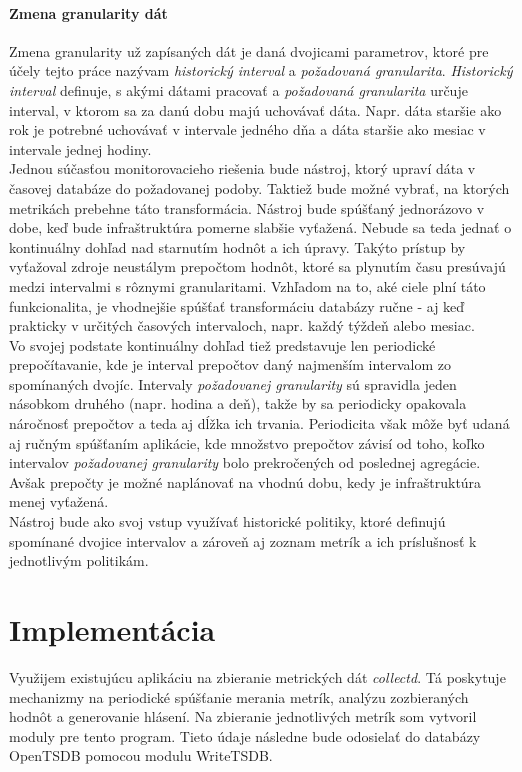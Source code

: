 \documentclass[12pt,twoside,color,cover,table]{fithesis3}
\begin{document}
\subsubsection{Zmena granularity dát}
Zmena granularity už zapísaných dát je daná dvojicami parametrov, ktoré pre účely tejto práce nazývam
\textit{historický interval} a \textit{požadovaná granularita}. \textit{Historický interval} definuje, s akými dátami pracovať a 
\textit{požadovaná granularita} určuje
interval, v ktorom sa za danú dobu majú uchovávať dáta. Napr. dáta staršie ako rok je potrebné uchovávať v intervale jedného dňa a 
dáta staršie ako mesiac v intervale jednej hodiny. 
\\Jednou súčasťou monitorovacieho riešenia bude nástroj, ktorý upraví dáta v časovej databáze do požadovanej podoby.
Taktiež bude možné vybrať,
na ktorých metrikách prebehne táto transformácia. Nástroj bude spúšťaný jednorázovo v dobe, keď bude infraštruktúra pomerne slabšie vyťažená.
Nebude sa teda jednať o kontinuálny dohľad nad starnutím hodnôt a ich úpravy. Takýto prístup by vyťažoval zdroje neustálym prepočtom hodnôt,
ktoré sa plynutím času presúvajú medzi intervalmi s rôznymi granularitami. Vzhľadom na to, aké ciele plní táto funkcionalita,
je vhodnejšie spúšťať transformáciu databázy ručne - aj keď prakticky v určitých časových intervaloch, napr. každý týždeň alebo mesiac.
\\Vo svojej podstate kontinuálny dohľad tiež predstavuje len periodické prepočítavanie, kde je interval prepočtov daný najmenším intervalom zo 
spomínaných dvojíc. Intervaly \textit{požadovanej granularity} sú spravidla jeden násobkom druhého (napr. hodina a deň), takže
by sa periodicky opakovala náročnosť prepočtov a teda aj dĺžka ich trvania. Periodicita však môže byť udaná aj ručným spúšťaním aplikácie, 
kde množstvo prepočtov závisí od toho, koľko intervalov \textit{požadovanej granularity} bolo prekročených od poslednej agregácie.
Avšak prepočty je možné naplánovať na vhodnú dobu, kedy je infraštruktúra menej vyťažená. 
\\Nástroj bude ako svoj vstup využívať historické politiky, ktoré definujú spomínané dvojice intervalov a zároveň aj zoznam metrík
a ich príslušnosť k jednotlivým politikám.

\chapter{Implementácia}
Využijem existujúcu aplikáciu na zbieranie metrických dát \emph{collectd}. Tá poskytuje mechanizmy na periodické spúšťanie merania metrík,
analýzu zozbieraných hodnôt a generovanie hlásení. Na zbieranie jednotlivých metrík som vytvoril moduly pre tento program. Tieto údaje následne bude odosielať do databázy OpenTSDB
pomocou modulu WriteTSDB.
\end{document}
